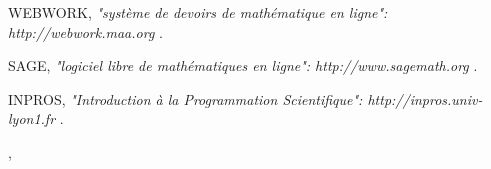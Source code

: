 \documentclass[10pt]{article}
\def\auteurenbasdepage#1#2#3{\small{\bf #1}, \small{#2}\\ \small{\tt #3}\\ }
\begin{document}

\begin{thebibliography}{99}

 {\sc WEBWORK}, {\sl "syst\`eme de devoirs de math\'ematique en ligne":  http://webwork.maa.org} .

 {\sc SAGE}, {\sl "logiciel libre de math\'ematiques en ligne":  http://www.sagemath.org} .

 {\sc INPROS}, {\sl "Introduction \`a la Programmation Scientifique": http://inpros.univ-lyon1.fr} .
\end{thebibliography}
%
\vfill
\auteurenbasdepage{\NomOrateur}{\AdresseLongueOrateur}{\EmailOrateur}
%
\end{document}
